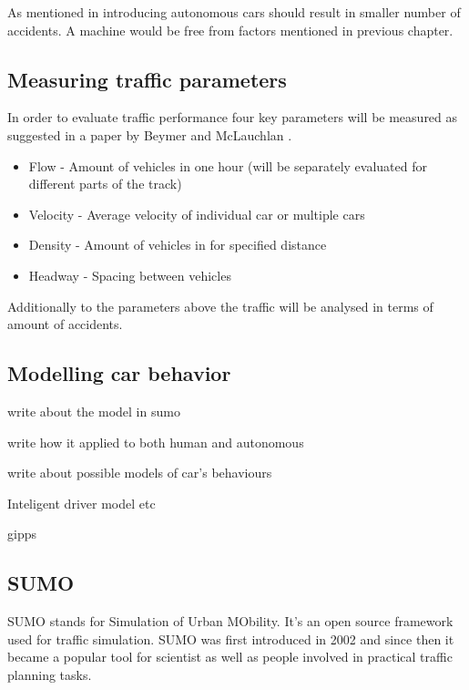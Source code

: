 \documentclass[11pt,english]{article}
\begin{document}
As mentioned in %
introducing autonomous cars should result in smaller number of accidents. A machine would be free from factors mentioned in previous chapter. 






\subsection{Measuring traffic parameters}

In order to evaluate traffic performance four key parameters will be measured as suggested in a paper by Beymer and McLauchlan \citep{beymer1997real}. 

\begin{itemize}
  \item Flow - Amount of vehicles in one hour (will be separately evaluated for different parts of the track)
  \item Velocity - Average velocity of individual car or multiple cars
  \item Density - Amount of vehicles in for specified distance
  \item Headway - Spacing between vehicles
\end{itemize}

Additionally to the parameters above the traffic will be analysed in terms of amount of accidents.



\subsection{Modelling car behavior}

write about the model in sumo

write how it applied to both human and autonomous

write about possible models of car's behaviours

Inteligent driver model etc

gipps

\subsection{SUMO}

SUMO stands for Simulation of Urban MObility. It's an open source framework used for traffic simulation\citep{krajzewicz2002sumo}. SUMO was first introduced in 2002 and since then it became a popular tool for scientist as well as people involved in practical traffic planning tasks. 
\end{document}
